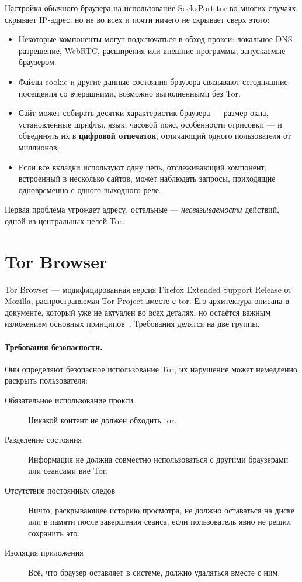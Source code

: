 Настройка обычного браузера на использование SocksPort tor во многих случаях скрывает IP-адрес, но не во всех и почти ничего не скрывает сверх этого:
\begin{itemize}
  \item Некоторые компоненты могут подключаться в обход прокси: локальное DNS-разрешение, WebRTC, расширения или внешние программы, запускаемые браузером.
  \item Файлы cookie и другие данные состояния браузера связывают сегодняшние посещения со вчерашними, возможно выполненными без Tor.
  \item Сайт может собирать десятки характеристик браузера — размер окна, установленные шрифты, язык, часовой пояс, особенности отрисовки — и объединять их в \textbf{цифровой отпечаток}, отличающий одного пользователя от миллионов.
  \item Если все вкладки используют одну цепь, отслеживающий компонент, встроенный в несколько сайтов, может наблюдать запросы, приходящие одновременно с одного выходного реле.
\end{itemize}
Первая проблема угрожает адресу, остальные — \emph{несвязываемости} действий, одной из центральных целей Tor.

\section{Tor Browser}\label{sec:browser-tb}

Tor Browser — модифицированная версия Firefox Extended Support Release от Mozilla, распространяемая Tor Project вместе с tor. Его архитектура описана в документе, который уже не актуален во всех деталях, но остаётся важным изложением основных принципов~\cite{perry2018torbrowser}. Требования делятся на две группы.

\paragraph{Требования безопасности.} Они определяют безопасное использование Tor; их нарушение может немедленно раскрыть пользователя:
\begin{description}
  \item[Обязательное использование прокси] Никакой контент не должен обходить tor.
  \item[Разделение состояния] Информация не должна совместно использоваться с другими браузерами или сеансами вне Tor.
  \item[Отсутствие постоянных следов] Ничто, раскрывающее историю просмотра, не должно оставаться на диске или в памяти после завершения сеанса, если пользователь явно не решил сохранить это.
  \item[Изоляция приложения] Всё, что браузер оставляет в системе, должно удаляться вместе с ним.
\end{description}


